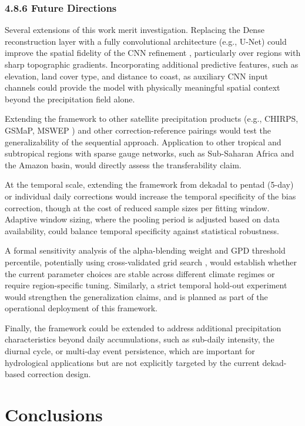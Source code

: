 \documentclass[
]{article}
\begin{document}
\subsubsection{4.8.6 Future Directions}\label{future-directions}

Several extensions of this work merit investigation. Replacing the Dense
reconstruction layer with a fully convolutional architecture (e.g.,
U-Net) could improve the spatial fidelity of the CNN refinement
\cite{ref40,ref41}, particularly over regions with sharp topographic gradients.
Incorporating additional predictive features, such as elevation, land
cover type, and distance to coast, as auxiliary CNN input channels could
provide the model with physically meaningful spatial context beyond the
precipitation field alone.

Extending the framework to other satellite precipitation products (e.g.,
CHIRPS, GSMaP, MSWEP \cite{ref42}) and other correction-reference pairings
would test the generalizability of the sequential approach. Application
to other tropical and subtropical regions with sparse gauge networks,
such as Sub-Saharan Africa and the Amazon basin, would directly assess
the transferability claim.

At the temporal scale, extending the framework from dekadal to pentad
(5-day) or individual daily corrections would increase the temporal
specificity of the bias correction, though at the cost of reduced sample
sizes per fitting window. Adaptive window sizing, where the pooling
period is adjusted based on data availability, could balance temporal
specificity against statistical robustness.

A formal sensitivity analysis of the alpha-blending weight and GPD
threshold percentile, potentially using cross-validated grid search
\cite{ref43}, would establish whether the current parameter choices are
stable across different climate regimes or require region-specific
tuning. Similarly, a strict temporal hold-out experiment would
strengthen the generalization claims, and is planned as part of the
operational deployment of this framework.

Finally, the framework could be extended to address additional
precipitation characteristics beyond daily accumulations, such as
sub-daily intensity, the diurnal cycle, or multi-day event persistence,
which are important for hydrological applications but are not explicitly
targeted by the current dekad-based correction design.

\section{Conclusions}\label{conclusions}
\end{document}
